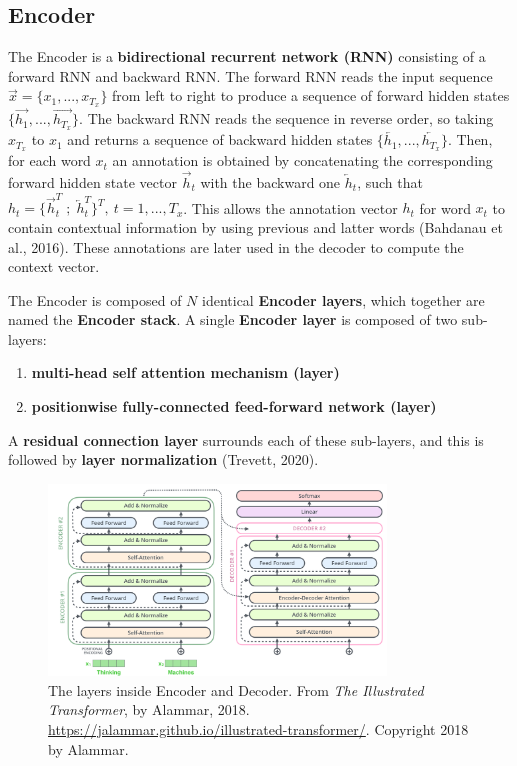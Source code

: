 \subsection{Encoder}

The Encoder is a \textbf{bidirectional recurrent network (RNN)} consisting of a forward RNN and backward RNN. The forward RNN reads the input sequence $\overrightarrow{x} = \Big\{ x_1,...,x_{T_x} \Big\}$ from left to right to produce a sequence of forward hidden states $\Big\{ \overrightarrow{h_1},..., \overrightarrow{h_{T_x}} \Big\}$. The backward RNN reads the sequence in reverse order, so taking $x_{T_x}$ to $x_1$ and returns a sequence of backward hidden states $\Big\{ \overleftarrow{h_1},..., \overleftarrow{h_{T_x}} \Big\}$. Then, for each word $x_t$ an annotation is obtained by concatenating the corresponding forward hidden state vector $\overrightarrow{h}_t$ with the backward one $\overleftarrow{h}_t$, such that $h_t = \Big \{ \overrightarrow{h}_t^T \; ; \; \overleftarrow{h}_t^T \Big\}^T , \: t=1,...,T_x$. This allows the annotation vector $h_t$ for word $x_t$ to contain contextual information by using previous and latter words (Bahdanau et al., 2016). These annotations are later used in the decoder to compute the context vector. 

The Encoder is composed of $N$ identical \textbf{Encoder layers}, which together are named the \textbf{Encoder stack}. A single \textbf{Encoder layer}  is composed of two sub-layers: 
\begin{enumerate}
    \item \textbf{multi-head self attention mechanism (layer)}
    
    \item \textbf{positionwise fully-connected feed-forward network (layer)}
\end{enumerate}

A \textbf{residual connection layer} surrounds each of these sub-layers, and this is followed by \textbf{layer normalization} (Trevett, 2020).  




\begin{figure}[h]
\vspace{-10pt}
\centering
\includegraphics[width=0.8\textwidth]{imgs/encoderDecoderLayersDetailed.png}
\vspace{-10pt}
\caption{\footnotesize The layers inside Encoder and Decoder. From \emph{The Illustrated Transformer}, by Alammar, 2018. \url{https://jalammar.github.io/illustrated-transformer/}. Copyright 2018 by Alammar.}
\vspace{-5pt}
\end{figure}




